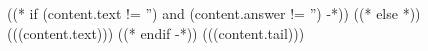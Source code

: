 ((* if (content.text != '') and (content.answer != '') -*))
((* else *))
(((content.text)))
((* endif -*))
(((content.tail)))
